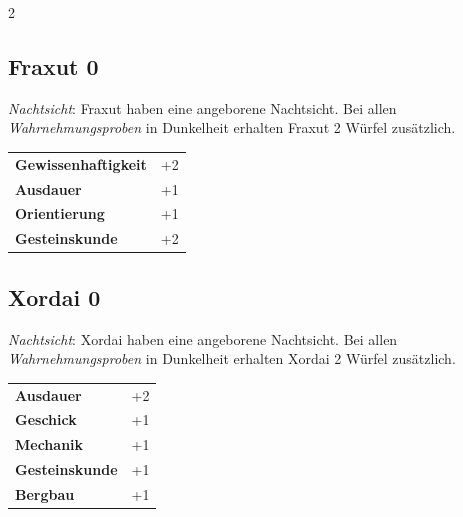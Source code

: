 \begin{multicols}{2}
\begin{tcolorbox}
\end{tcolorbox}

\begin{tcolorbox}
    \subsection*{Fraxut \hfill \small{0 }}
    \tcblower
\textit{Nachtsicht}: Fraxut haben eine angeborene Nachtsicht. Bei allen \textit{Wahrnehmungsproben} in Dunkelheit erhalten Fraxut 2 Würfel zusätzlich.


\vspace{3mm}

\begin{tabular}{@{}ll@{}}
    \textbf{Gewissenhaftigkeit} & +2\\
    \textbf{Ausdauer} & +1\\
    \textbf{Orientierung} & +1\\
    \textbf{Gesteinskunde} & +2\\
\end{tabular}


\end{tcolorbox}

\begin{tcolorbox}
    \subsection*{Xordai \hfill \small{0 }}
    \tcblower
\textit{Nachtsicht}: Xordai haben eine angeborene Nachtsicht. Bei allen \textit{Wahrnehmungsproben} in Dunkelheit erhalten Xordai 2 Würfel zusätzlich.


\vspace{3mm}

\begin{tabular}{@{}ll@{}}
    \textbf{Ausdauer} & +2\\
    \textbf{Geschick} & +1\\
    \textbf{Mechanik} & +1\\
    \textbf{Gesteinskunde} & +1\\
    \textbf{Bergbau} & +1\\
\end{tabular}



\end{tcolorbox}
\end{multicols}
